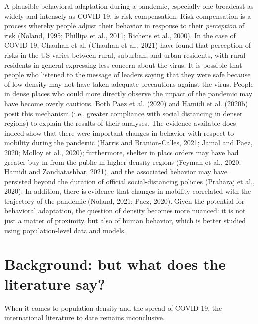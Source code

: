 \documentclass[]{elsarticle} %
\begin{document}
A plausible behavioral adaptation during a pandemic, especially one
broadcast as widely and intensely as COVID-19, is risk compensation.
Risk compensation is a process whereby people adjust their behavior in
response to their \emph{perception} of risk (Noland, 1995; Phillips et
al., 2011; Richens et al., 2000). In the case of COVID-19, Chauhan et
al. (Chauhan et al., 2021) have found that perception of risks in the US
varies between rural, suburban, and urban residents, with rural
residents in general expressing less concern about the virus. It is
possible that people who listened to the message of leaders saying that
they were safe because of low density may not have taken adequate
precautions against the virus. People in dense places who could more
directly observe the impact of the pandemic may have become overly
cautious. Both Paez et al. (2020) and Hamidi et al. (2020b) posit this
mechanism (i.e., greater compliance with social distancing in denser
regions) to explain the results of their analyses. The evidence
available does indeed show that there were important changes in behavior
with respect to mobility during the pandemic (Harris and Branion-Calles,
2021; Jamal and Paez, 2020; Molloy et al., 2020); furthermore, shelter
in place orders may have had greater buy-in from the public in higher
density regions (Feyman et al., 2020; Hamidi and Zandiatashbar, 2021),
and the associated behavior may have persisted beyond the duration of
official social-distancing policies (Praharaj et al., 2020). In
addition, there is evidence that changes in mobility correlated with the
trajectory of the pandemic (Noland, 2021; Paez, 2020). Given the
potential for behavioral adaptation, the question of density becomes
more nuanced: it is not just a matter of proximity, but also of human
behavior, which is better studied using population-level data and
models.

\hypertarget{background-but-what-does-the-literature-say}{%
\section{Background: but what does the literature
say?}\label{background-but-what-does-the-literature-say}}

When it comes to population density and the spread of COVID-19, the
international literature to date remains inconclusive.
\end{document}

